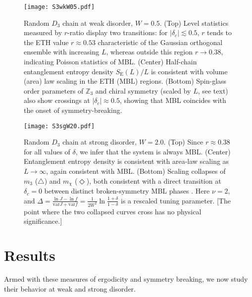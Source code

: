 \documentclass[prb,aps, twocolumn, superscriptaddress]{revtex4-1}
\begin{document}
 \begin{figure}[t]
\texttt{[image: S3wkW05.pdf]} 
\caption{\label{fig:weakdisorder} Random $D_3$ chain at weak disorder, $W=0.5$.  (Top) Level statistics measured by $r$-ratio display two transitions: for $|\delta_c|\lesssim 0.5$,  $r$ tends to the ETH value $r\approx 0.53$ characteristic of the Gaussian orthogonal ensemble with increasing $L$, whereas outside this region $r\rightarrow 0.38$, indicating Poisson statistics of MBL. (Center) Half-chain entanglement entropy density  $S_{\text{E}}(L)/L$ is consistent with volume (area) law scaling in the ETH (MBL) regions. (Bottom)  Spin-glass order parameters of ${\mathbb{Z}_3}$  and chiral symmetry (scaled by $L$, see text) also show crossings at $|\delta_c|\approx 0.5$, showing that MBL coincides with the onset of symmetry-breaking.}
\end{figure}


 \begin{figure}[t]
\texttt{[image: S3sgW20.pdf]}
\caption{\label{fig:strongdisorder} Random $D_3$ chain at strong disorder, $W=2.0$. (Top) Since $r\approx 0.38$ for all values of $\delta$, we infer that the system is always MBL. (Center) Entanglement entropy density is consistent with area-law scaling as $L\rightarrow\infty$, again consistent with MBL. (Bottom) Scaling collapses of  ${m_3}$ ($\triangle$) and $m_{\chi}$ ($\Diamond$), both consistent with a direct transition at $\delta_c=0$ between distinct broken-symmetry MBL phases%
. Here $\nu=2$, and $\Delta= \frac{\overline{\ln J} - \overline{\ln f}}{{\text{var} J}+{\text{var} f}} =\frac{1}{2W^2}\ln\frac{1+\delta}{1-\delta}$ is a rescaled tuning parameter. [The point where the two collapsed curves cross has no physical significance.]} 
\end{figure}




\section{Results}
Armed with these measures of ergodicity and symmetry breaking, we now study their behavior at weak and strong disorder.
\end{document}
